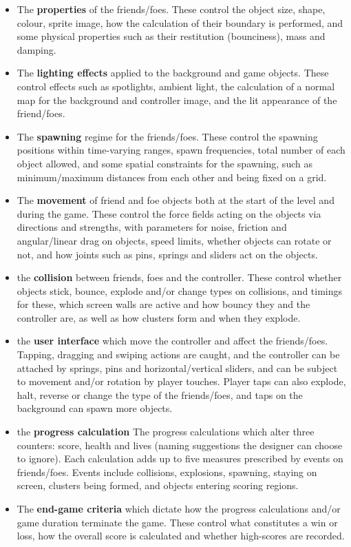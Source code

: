 \documentclass{IEEEtran}
\begin{document}
\begin{itemize}
\item The \textbf{properties} of the friends/foes. These control the
object size, shape, colour, sprite image, how the calculation of their boundary is performed, and some physical
properties such as their restitution (bounciness), mass and
damping.
\item The \textbf{lighting effects} applied to the background and
game objects. These control effects such as spotlights,
ambient light, the calculation of a normal map for the
background and controller image, and the lit appearance
of the friend/foes.
\item The \textbf{spawning} regime for the friends/foes. These control the spawning positions within time-varying ranges,
spawn frequencies, total number of each object allowed,
and some spatial constraints for the spawning, such as
minimum/maximum distances from each other and being
fixed on a grid.
\item The \textbf{movement} of friend and foe objects both at the start
of the level and during the game. These control the force
fields acting on the objects via directions and strengths,
with parameters for noise, friction and angular/linear drag
on objects, speed limits, whether objects can rotate or not,
and how joints such as pins, springs and sliders act on
the objects.
\item the \textbf{collision} between friends, foes and the controller.
These control whether objects stick, bounce, explode
and/or change types on collisions, and timings for these,
which screen walls are active and how bouncy they and
the controller are, as well as how clusters form and when
they explode.
\item the \textbf{user interface} which move the controller and
affect the friends/foes. Tapping, dragging and swiping
actions are caught, and the controller can be attached by
springs, pins and horizontal/vertical sliders, and can be
subject to movement and/or rotation by player touches.
Player taps can also explode, halt, reverse or change the
type of the friends/foes, and taps on the background can
spawn more objects.
\item the \textbf{progress calculation} The progress calculations which alter three counters:
score, health and lives (naming suggestions the designer
can choose to ignore). Each calculation adds up to five
measures prescribed by events on friends/foes. Events include collisions, explosions, spawning, staying on screen,
clusters being formed, and objects entering scoring regions.

\item The \textbf{end-game criteria} which dictate how the progress calculations and/or game duration terminate the game. These control what constitutes a win or loss, how the overall score is calculated and whether high-scores are recorded.

\end{itemize}
\end{document}
